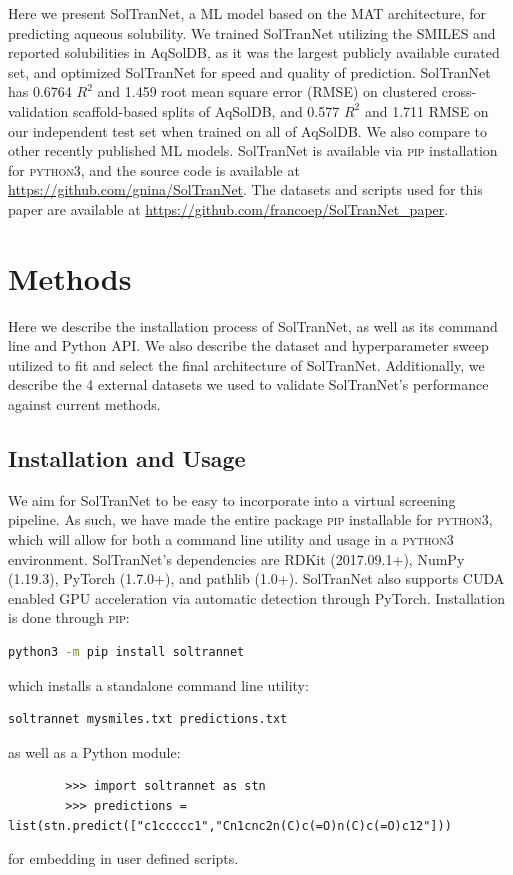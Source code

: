 \documentclass[journal=jcim,manuscript=applicationnotes]{achemso}
\begin{document}
Here we present SolTranNet, a ML model based on the MAT architecture, for predicting aqueous solubility.
We trained SolTranNet utilizing the SMILES and reported solubilities in AqSolDB\cite{AqSol}, as it was the largest publicly available curated set, and optimized SolTranNet for speed and quality of prediction.
SolTranNet has 0.6764 $R^2$ and 1.459 root mean square error (RMSE) on clustered cross-validation scaffold-based splits of AqSolDB, and 0.577 $R^2$ and 1.711 RMSE on our independent test set when trained on all of AqSolDB.
We also compare to other recently published ML models.\cite{lovric,cui,boobier,llinas}
SolTranNet is available via \textsc{pip} installation for \textsc{python3}, and the source code is available at \url{https://github.com/gnina/SolTranNet}. The datasets and scripts used for this paper are available at \url{https://github.com/francoep/SolTranNet_paper}.


\section{Methods}

Here we describe the installation process of SolTranNet, as well as its command line and Python API.
We also describe the dataset and hyperparameter sweep utilized to fit and select the final architecture of SolTranNet.
Additionally, we describe the 4 external datasets we used to validate SolTranNet's performance against current methods.

\subsection{Installation and Usage}
We aim for SolTranNet to be easy to incorporate into a virtual screening pipeline.
As such, we have made the entire package \textsc{\textsc{pip}} installable for \textsc{python3}, which will allow for both a command line utility and usage in a \textsc{python3} environment. 
SolTranNet's dependencies are RDKit\cite{rdkit} (2017.09.1+),  NumPy\cite{numpy} (1.19.3), PyTorch\cite{pytorch} (1.7.0+), and pathlib (1.0+).
SolTranNet also supports CUDA enabled GPU acceleration via automatic detection through PyTorch.  Installation is done through \textsc{pip}: \\
        \begin{lstlisting}[frame=none,language=bash]
 python3 -m pip install soltrannet
        \end{lstlisting}
which installs a standalone command line utility:
        \begin{lstlisting}[frame=none,language=bash]
soltrannet mysmiles.txt predictions.txt
        \end{lstlisting}
as well as a Python module:
        \begin{verbatim}
        >>> import soltrannet as stn
        >>> predictions = list(stn.predict(["c1ccccc1","Cn1cnc2n(C)c(=O)n(C)c(=O)c12"]))
        \end{verbatim}
 for embedding in user defined scripts.
\end{document}

